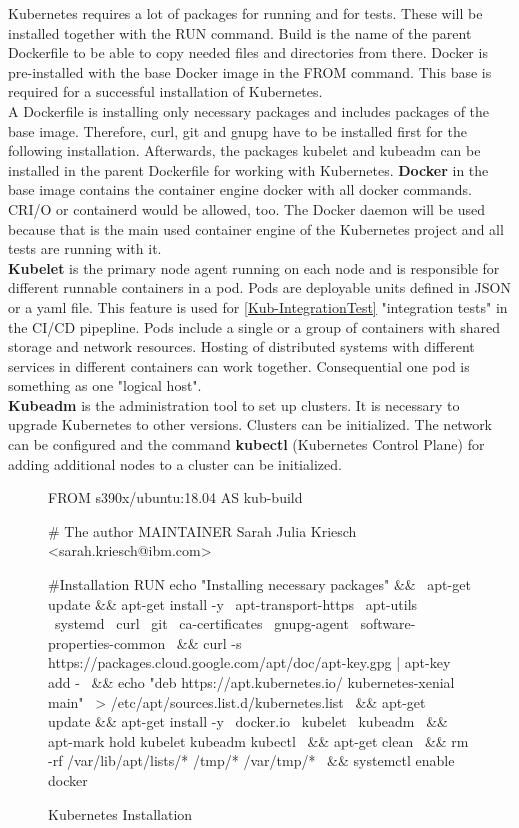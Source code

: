 Kubernetes requires a lot of packages for running and for tests. These will be installed together with the RUN command.
Build is the name of the parent Dockerfile to be able to copy needed files and directories from there.
Docker is pre-installed with the base Docker image in the FROM command. This base is required for a successful installation of Kubernetes. \\
A Dockerfile is installing only necessary packages and includes packages of the base image. Therefore, curl, git and gnupg have to be installed first for the following installation.
Afterwards, the packages kubelet and kubeadm can be installed in the parent Dockerfile for working with Kubernetes. \textbf{Docker} in the base image contains the container engine docker with all docker commands. CRI/O or containerd would be allowed, too. 
The Docker daemon will be used because that is the main used container engine of the Kubernetes project and all tests are running with it. \\ 
\textbf{Kubelet} is the primary node agent running on each node and is responsible for different runnable containers in a pod. Pods are deployable units defined in JSON or a yaml file. This feature is used for \ref{Kub-IntegrationTest} "integration tests" in the \gls{CI/CD} pipepline.
Pods include a single or a group of containers with shared storage and network resources. Hosting of distributed systems  with different services in different containers can work together. Consequential one pod is something as one "logical host". \\
\textbf{Kubeadm} is the administration tool to set up clusters. It is necessary to upgrade Kubernetes to other versions. Clusters can be initialized. The network can be configured and the command \textbf{kubectl} (Kubernetes Control Plane) for adding additional nodes to a cluster can be initialized. 

\begin{figure}[H]
\centering
\begin{boxedverbatim}
FROM s390x/ubuntu:18.04 AS kub-build
 
# The author
MAINTAINER Sarah Julia Kriesch <sarah.kriesch@ibm.com>

#Installation
RUN echo "Installing necessary packages" && \
apt-get update && apt-get install -y \
apt-transport-https \
apt-utils \
systemd \
curl \
git \
ca-certificates \
gnupg-agent \
software-properties-common \
&& curl -s https://packages.cloud.google.com/apt/doc/apt-key.gpg | apt-key add - \
&& echo "deb https://apt.kubernetes.io/ kubernetes-xenial main" \
> /etc/apt/sources.list.d/kubernetes.list \
&& apt-get update && apt-get install -y \
docker.io \
kubelet \
kubeadm \
&& apt-mark hold kubelet kubeadm kubectl \
&& apt-get clean \
&& rm -rf /var/lib/apt/lists/* /tmp/* /var/tmp/* \
&& systemctl enable docker 
\end{boxedverbatim}
 \caption{Kubernetes Installation}
    \label{kubernetes-installation}
\end{figure}

